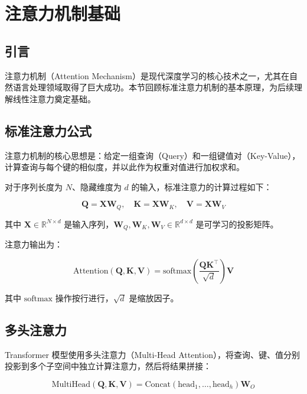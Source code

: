 \chapter{注意力机制基础}

\section{引言}

注意力机制（Attention Mechanism）是现代深度学习的核心技术之一，尤其在自然语言处理领域取得了巨大成功。本节回顾标准注意力机制的基本原理，为后续理解线性注意力奠定基础。

\section{标准注意力公式}

注意力机制的核心思想是：给定一组查询（Query）和一组键值对（Key-Value），计算查询与每个键的相似度，并以此作为权重对值进行加权求和。

对于序列长度为 $N$、隐藏维度为 $d$ 的输入，标准注意力的计算过程如下：

\begin{equation}
    \mathbf{Q} = \mathbf{X}\mathbf{W}_Q, \quad
    \mathbf{K} = \mathbf{X}\mathbf{W}_K, \quad
    \mathbf{V} = \mathbf{X}\mathbf{W}_V
\end{equation}

其中 $\mathbf{X} \in \mathbb{R}^{N \times d}$ 是输入序列，$\mathbf{W}_Q, \mathbf{W}_K, \mathbf{W}_V \in \mathbb{R}^{d \times d}$ 是可学习的投影矩阵。

注意力输出为：

\begin{equation}
    \text{Attention}(\mathbf{Q}, \mathbf{K}, \mathbf{V}) = \text{softmax}\left(\frac{\mathbf{Q}\mathbf{K}^\top}{\sqrt{d}}\right)\mathbf{V}
\end{equation}

其中 $\text{softmax}$ 操作按行进行，$\sqrt{d}$ 是缩放因子。

\section{多头注意力}

Transformer 模型使用多头注意力（Multi-Head Attention），将查询、键、值分别投影到多个子空间中独立计算注意力，然后将结果拼接：

\begin{equation}
    \text{MultiHead}(\mathbf{Q}, \mathbf{K}, \mathbf{V}) = \text{Concat}(\text{head}_1, \ldots, \text{head}_h)\mathbf{W}_O
\end{equation}

